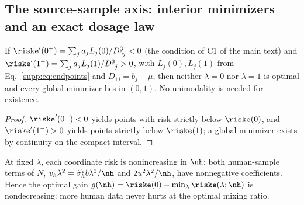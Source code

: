 \subsection{The source-sample axis: interior minimizers and an exact dosage law}

\begin{corollary}\label{supp:cor:interior}
If $\riske'(0^+) = \sum_j a_j L_j(0)/D_{0j}^3 < 0$ (the condition of C1 of the main text) and $\riske'(1^-) = \sum_j a_j L_j(1)/D_{1j}^3 > 0$, with $L_j(0), L_j(1)$ from Eq.~\eqref{supp:eq:endpoints} and $D_{1j} = b_j + \mu$, then neither $\lambda = 0$ nor $\lambda = 1$ is optimal and every global minimizer lies in $(0,1)$.
No unimodality is needed for existence.
\end{corollary}

\begin{proof}
$\riske'(0^+) < 0$ yields points with risk strictly below $\riske(0)$, and $\riske'(1^-) > 0$ yields points strictly below $\riske(1)$; a global minimizer exists by continuity on the compact interval.
\end{proof}

\begin{lemma}\label{supp:lem:monoval}
At fixed $\lambda$, each coordinate risk is nonincreasing in $\nh$: both human-sample terms of $N$, $v_h\lambda^2 = \tilde\sigma_h^2 b \lambda^2/\nh$ and $2u^2\lambda^2/\nh$, have nonnegative coefficients.
Hence the optimal gain $g(\nh) = \riske(0) - \min_{\lambda}\riske(\lambda; \nh)$ is nondecreasing: more human data never hurts at the optimal mixing ratio.
\end{lemma}

